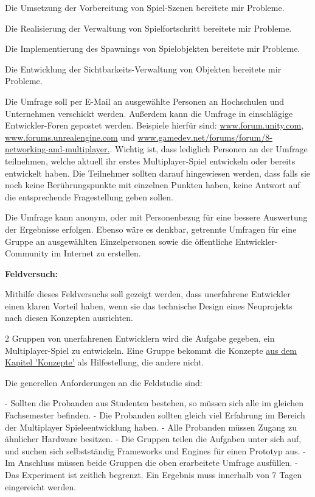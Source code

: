 Die Umsetzung der Vorbereitung von Spiel-Szenen bereitete mir Probleme.

Die Realisierung der Verwaltung von Spielfortschritt bereitete mir Probleme.

Die Implementierung des Spawnings von Spielobjekten bereitete mir Probleme.

Die Entwicklung der Sichtbarkeits-Verwaltung von Objekten bereitete mir Probleme.

Die Umfrage soll per E-Mail an ausgewählte Personen an Hochschulen und Unternehmen verschickt werden. Außerdem kann die Umfrage in einschlägige Entwickler-Foren gepostet werden. Beispiele hierfür sind: \href{www.forum.unity.com}{www.forum.unity.com}, \href{www.forums.unrealengine.com}{www.forums.unrealengine.com} und \href{www.gamedev.net/forums/forum/8-networking-and-multiplayer}{www.gamedev.net/forums/forum/8-networking-and-multiplayer.}. Wichtig ist, dass lediglich Personen an der Umfrage teilnehmen, welche aktuell ihr erstes Multiplayer-Spiel entwickeln oder bereits entwickelt haben. Die Teilnehmer sollten darauf hingewiesen werden, dass falls sie noch keine Berührungspunkte mit einzelnen Punkten haben, keine Antwort auf die entsprechende Fragestellung geben sollen.

Die Umfrage kann anonym, oder mit Personenbezug für eine bessere Auswertung der Ergebnisse erfolgen. Ebenso wäre es denkbar, getrennte Umfragen für eine Gruppe an ausgewählten Einzelpersonen sowie die öffentliche Entwickler-Community im Internet zu erstellen.

\textbf{Feldversuch:}

Mithilfe dieses Feldversuchs soll gezeigt werden, dass unerfahrene Entwickler einen klaren Vorteil haben, wenn sie das technische Design eines Neuprojekts nach diesen Konzepten ausrichten. 

2 Gruppen von unerfahrenen Entwicklern wird die Aufgabe gegeben, ein Multiplayer-Spiel zu entwickeln. Eine Gruppe bekommt die Konzepte \hyperref[sec:konzepte]{aus dem Kapitel 'Konzepte'} als Hilfestellung, die andere nicht.

Die generellen Anforderungen an die Feldstudie sind:

- Sollten die Probanden aus Studenten bestehen, so müssen sich alle im gleichen Fachsemester befinden.
- Die Probanden sollten gleich viel Erfahrung im Bereich der Multiplayer Spieleentwicklung haben.
- Alle Probanden müssen Zugang zu ähnlicher Hardware besitzen.
- Die Gruppen teilen die Aufgaben unter sich auf, und suchen sich selbstständig Frameworks und Engines für einen Prototyp aus.
- Im Anschluss müssen beide Gruppen die oben erarbeitete Umfrage ausfüllen.
- Das Experiment ist zeitlich begrenzt. Ein Ergebnis muss innerhalb von 7 Tagen eingereicht werden.

